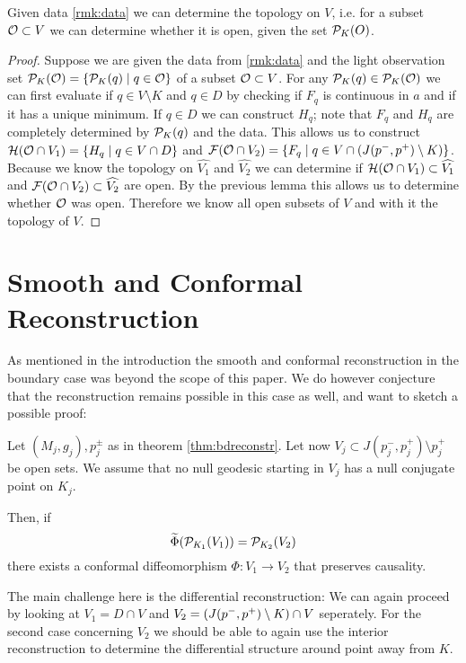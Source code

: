 \begin{proposition}
    Given data \ref{rmk:data} we can determine the topology on $V$, i.e. for a subset ${\mathcal{O}}\subset V$ we can determine whether it is open, given the set ${\mathcal{P}}_K(O)$.
\end{proposition}
\begin{proof}Suppose we are given the data from \ref{rmk:data} and the light observation set ${\mathcal{P}}_K({\mathcal{O}})=\{{\mathcal{P}}_K(q)\mid q\in {\mathcal{O}}\}$ of a subset ${\mathcal{O}}\subset V$. For any ${\mathcal{P}}_K(q)\in {\mathcal{P}}_K({\mathcal{O}})$ we can first evaluate if $q\in V\setminus K$ and $q\in D$ by checking if $F_q$ is continuous in $a$ and if it has a unique minimum. If $q\in D$ we can construct $H_q$; note that $F_q$ and $H_q$ are completely determined by ${\mathcal{P}}_K(q)$ and the data. This allows us to construct ${\mathcal{H}}({\mathcal{O}}\cap V_1)=\{H_q \mid q\in V \cap D\}$ and ${\mathcal{F}}({\mathcal{O}}\cap V_2)=\{F_q \mid q\in V \cap (J(p^-,p^+)\setminus K)\}$. Because we know the topology on $\widehat{V_1}$ and $\widehat{V_2}$ we can determine if ${\mathcal{H}}({\mathcal{O}}\cap V_1)\subset \widehat{V_1}$ and ${\mathcal{F}}({\mathcal{O}}\cap V_2)\subset\widehat{V_2}$ are open. By the previous lemma this allows us to determine whether ${\mathcal{O}}$ was open. Therefore we know all open subsets of $V$ and with it the topology of $V$.
\end{proof}

\section{Smooth and Conformal Reconstruction}
As mentioned in the introduction the smooth and conformal reconstruction in the boundary case was beyond the scope of this paper. We do however conjecture that the reconstruction remains possible in this case as well, and want to sketch a possible proof:
\begin{conjecture}
    Let $(M_j,g_j), p^\pm_j$ as in theorem \ref{thm:bdreconstr}. Let now $V_j\subset J(p_j^-,p_j^+) \setminus p_j^+$ be open sets. We assume that no null geodesic starting in $V_j$ has a null conjugate point on $K_j$. 
    
    Then, if 
    \[
    \widetilde{\Phi}({\mathcal{P}}_{K_1}(V_1)) = {\mathcal{P}}_{K_2}(V_2)
    \]
    there exists a conformal diffeomorphism $\Phi:V_1\to V_2$ that preserves causality.
\end{conjecture}

The main challenge here is the differential reconstruction: We can again proceed by looking at $V_1 = D\cap V$ and $V_2=(J(p^-,p^+) \setminus K)\cap V$ seperately. For the second case concerning $V_2$ we should be able to again use the interior reconstruction to determine the differential structure around point away from $K$.

